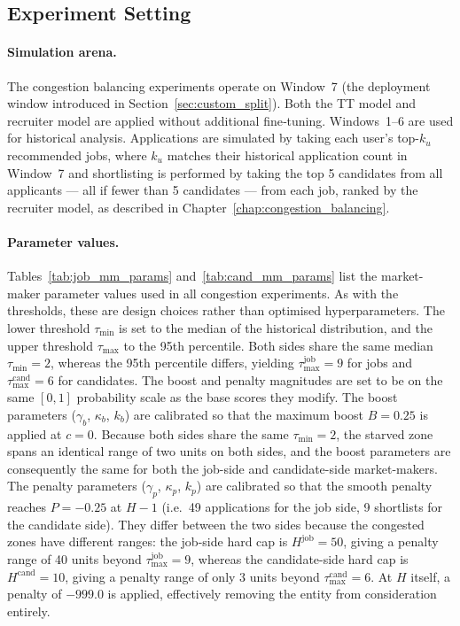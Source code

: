 \subsection{Experiment Setting}
\label{sec:exp_congestion_setting}
\paragraph{Simulation arena.}
The congestion balancing experiments operate on Window~7 (the deployment window introduced in Section~\ref{sec:custom_split}). Both the 
\gls{TT} model and recruiter model are applied without additional fine‑tuning. Windows~1--6 are used for historical analysis. Applications are simulated by taking each user's top-$k_u$ recommended 
jobs, where $k_u$ matches their historical application count in Window~7 and shortlisting is performed by taking the top 5 candidates from all 
applicants --- all if fewer than 5 candidates --- from each job, ranked by the recruiter model, as described in Chapter~\ref{chap:congestion_balancing}.

 
\paragraph{Parameter values.}
Tables~\ref{tab:job_mm_params} and~\ref{tab:cand_mm_params} list the
market-maker parameter values used in all congestion experiments. As with the
thresholds, these are design choices rather than optimised hyperparameters.
The lower threshold $\tau_{\min}$ is set to the median of the historical
distribution, and the upper threshold $\tau_{\max}$ to the 95th percentile.
Both sides share the same median $\tau_{\min} = 2$, whereas the 95th
percentile differs, yielding $\tau_{\max}^{\text{job}} = 9$ for jobs and
$\tau_{\max}^{\text{cand}} = 6$ for candidates. The boost and penalty
magnitudes are set to be on the same $[0,1]$ probability scale as the base
scores they modify. The boost parameters ($\gamma_b$, $\kappa_b$, $k_b$) are
calibrated so that the maximum boost $B = 0.25$ is applied at $c = 0$. Because both sides share the same $\tau_{\min}
= 2$, the starved zone spans an identical range of two units on both sides,
and the boost parameters are consequently the same for both the job-side and
candidate-side market-makers. The penalty parameters ($\gamma_p$, $\kappa_p$,
$k_p$) are calibrated so that the smooth penalty reaches $P = -0.25$ at $H-1$
(i.e.\ 49 applications for the job side, 9 shortlists for the candidate side).
They differ between the two sides because the congested zones have different
ranges: the job-side hard cap is $H^{\text{job}} = 50$, giving a penalty range
of 40 units beyond $\tau_{\max}^{\text{job}} = 9$, whereas the candidate-side
hard cap is $H^{\text{cand}} = 10$, giving a penalty range of only 3 units
beyond $\tau_{\max}^{\text{cand}} = 6$. At $H$ itself, a penalty of $-999.0$
is applied, effectively removing the entity from consideration entirely.

